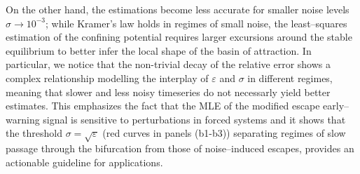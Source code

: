 On the other hand, the estimations become less accurate for smaller noise levels $\sigma\to10^{-3}$; while Kramer's law holds in regimes of small noise, the least--squares estimation of the confining potential requires larger excursions around the stable equilibrium to better infer the local shape of the basin of attraction.
In particular, we notice that the non-trivial decay of the relative error shows a complex relationship modelling the interplay of $\varepsilon$ and $\sigma$ in different regimes, meaning that slower and less noisy timeseries do not necessarly yield better estimates.
This emphasizes the fact that the MLE of the modified escape early--warning signal is sensitive to perturbations in forced systems and it shows that the threshold $\sigma=\sqrt{\varepsilon}$ (red curves in panels (b1-b3)) separating regimes of slow passage through the bifurcation from those of noise--induced escapes, provides an actionable guideline for applications.

